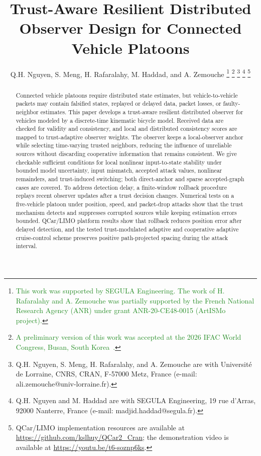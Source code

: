 \documentclass[letterpaper,journal]{IEEEtran}
\newcommand{\azrevcolor}{ForestGreen}
\newcommand{\azrev}[1]{\textcolor{\azrevcolor}{#1}}
\begin{document}
\title{Trust-Aware Resilient Distributed Observer Design for Connected Vehicle Platoons}
\author{Q.H. Nguyen, S. Meng, H. Rafaralahy, M. Haddad, and A. Zemouche%
\thanks{\azrev{This work was supported by SEGULA Engineering. The work of H. Rafaralahy and A. Zemouche was partially supported by the French National Research Agency (ANR) under grant ANR-20-CE48-0015 (ArtISMo project).}}%
\thanks{\azrev{A preliminary version of this work was accepted at the 2026 IFAC World Congress, Busan, South Korea~\cite{nguyen2026ifac}.}}%
\thanks{Q.H. Nguyen, S. Meng, H. Rafaralahy, and A. Zemouche are with Universit\'e de Lorraine, CNRS, CRAN, F-57000 Metz, France (e-mail: ali.zemouche@univ-lorraine.fr).}%
\thanks{Q.H. Nguyen and M. Haddad are with SEGULA Engineering, 19 rue d'Arras, 92000 Nanterre, France (e-mail: madjid.haddad@segula.fr).}%
\thanks{QCar/LIMO implementation resources are available at \protect\url{https://github.com/kslhuy/QCar2_Cran}; the demonstration video is available at \protect\url{https://youtu.be/t6-soznp6ks}.}}

\maketitle

\begin{abstract}
Connected vehicle platoons require distributed state estimates, but vehicle-to-vehicle packets may contain falsified states, replayed or delayed data, packet losses, or faulty-neighbor estimates. This paper develops a trust-aware resilient distributed observer for vehicles modeled by a discrete-time kinematic bicycle model. Received data are checked for validity and consistency, and local and distributed consistency scores are mapped to trust-adaptive observer weights. The observer keeps a local-observer anchor while selecting time-varying trusted neighbors, reducing the influence of unreliable sources without discarding cooperative information that remains consistent. We give checkable sufficient conditions for local nonlinear input-to-state stability under bounded model uncertainty, input mismatch, accepted attack values, nonlinear remainders, and trust-induced switching; both direct-anchor and sparse accepted-graph cases are covered. To address detection delay, a finite-window rollback procedure replays recent observer updates after a trust decision changes. Numerical tests on a five-vehicle platoon under position, speed, and packet-drop attacks show that the trust mechanism detects and suppresses corrupted sources while keeping estimation errors bounded. QCar/LIMO platform results show that rollback reduces position error after delayed detection, and the tested trust-modulated adaptive and cooperative adaptive cruise-control scheme preserves positive path-projected spacing during the attack interval.
\end{abstract}
\end{document}
